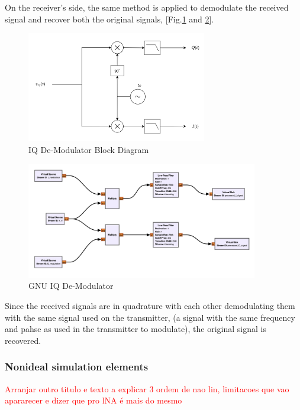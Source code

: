On the receiver's side, the same method is applied to demodulate the received signal and 
recover both the original signals, [Fig.\ref{fig:IQDeMod_Diagram} and  
\ref{fig:GNU_IQDemod}]. 

\begin{figure}[H]
    \centering
    \includegraphics*[width=0.7\textwidth]{Images/IQ_Demod_Diagram.png}
    \caption{IQ De-Modulator Block Diagram}
    \label{fig:IQDeMod_Diagram}
\end{figure}

\begin{figure}[H]
    \centering
    \includegraphics*[width=0.9\textwidth]{Images/GNU_Digital_IQDemod.png}
    \caption{GNU IQ De-Modulator}
    \label{fig:GNU_IQDemod}
\end{figure}

Since the received signals are in quadrature with each other demodulating them with the 
same signal used on the transmitter, (a signal with the same frequency and pahse as 
used in the transmitter to modulate), the original signal is recovered.

\subsubsection{Nonideal simulation elements}

\textcolor{red}{Arranjar outro titulo e texto a explicar 3 ordem de nao lin, limitacoes que vao apararecer e dizer que pro lNA é mais do mesmo}

